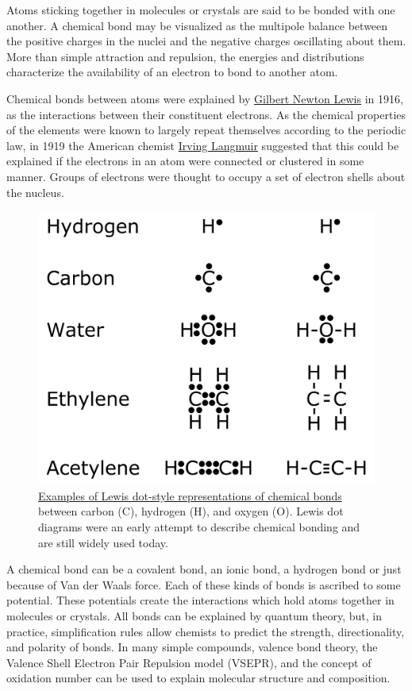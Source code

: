 Atoms sticking together in molecules or crystals are said to be bonded with one another. A chemical bond may be visualized as the multipole balance between the positive charges in the nuclei and the negative charges oscillating about them. More than simple attraction and repulsion, the energies and distributions characterize the availability of an electron to bond to another atom.

Chemical bonds between atoms were explained by \href{https://en.wikipedia.org/wiki/Gilbert_N._Lewis}{Gilbert Newton Lewis} in 1916, as the interactions between their constituent electrons. As the chemical properties of the elements were known to largely repeat themselves according to the periodic law, in 1919 the American chemist \href{https://en.wikipedia.org/wiki/Irving_Langmuir}{Irving Langmuir} suggested that this could be explained if the electrons in an atom were connected or clustered in some manner. Groups of electrons were thought to occupy a set of electron shells about the nucleus.



\begin{figure}

{\centering \includegraphics[width=0.7\linewidth]{./figures/chemistry/Electron_dot} 

}

\caption{\href{https://en.wikipedia.org/wiki/Chemical_bond\#/media/File:Electron_dot.svg}{Examples of Lewis dot-style representations of chemical bonds} between carbon (C), hydrogen (H), and oxygen (O). Lewis dot diagrams were an early attempt to describe chemical bonding and are still widely used today.}\label{fig:lewisbond}
\end{figure}

A chemical bond can be a covalent bond, an ionic bond, a hydrogen bond or just because of Van der Waals force. Each of these kinds of bonds is ascribed to some potential. These potentials create the interactions which hold atoms together in molecules or crystals. All bonds can be explained by quantum theory, but, in practice, simplification rules allow chemists to predict the strength, directionality, and polarity of bonds. In many simple compounds, valence bond theory, the Valence Shell Electron Pair Repulsion model (VSEPR), and the concept of oxidation number can be used to explain molecular structure and composition.


